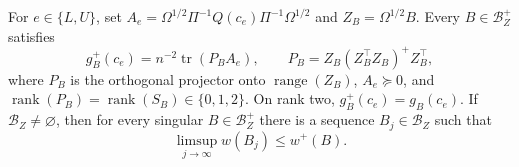 For \(e\in\{L,U\}\), set \(A_e=\Omega^{1/2}\Pi^{-1}Q(c_e)\Pi^{-1}\Omega^{1/2}\) and \(Z_B=\Omega^{1/2}B\).  Every \(B\in\mathcal B_Z^+\) satisfies
\[
 g_B^+(c_e)=n^{-2}\operatorname{tr}(P_BA_e),
 \qquad
 P_B=Z_B(Z_B^{\top}Z_B)^+Z_B^{\top},
\]
where \(P_B\) is the orthogonal projector onto \(\operatorname{range}(Z_B)\), \(A_e\succeq0\), and \(\operatorname{rank}(P_B)=\operatorname{rank}(S_B)\in\{0,1,2\}\).  On rank two, \(g_B^+(c_e)=g_B(c_e)\).  If \(\mathcal B_Z\ne\varnothing\), then for every singular \(B\in\mathcal B_Z^+\) there is a sequence \(B_j\in\mathcal B_Z\) such that
\[
 \limsup_{j\to\infty}w(B_j)\le w^+(B).
\]